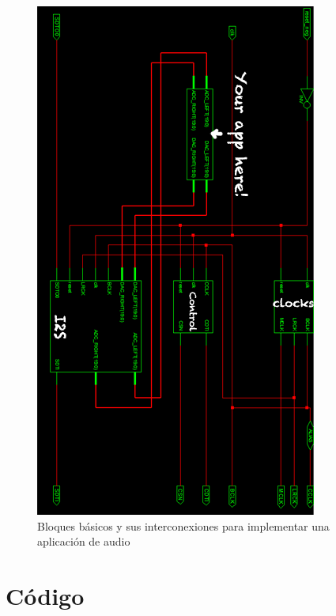 \begin{figure}[H]
\begin{center}
	\includegraphics[scale=0.85]{./fig}
\caption{Bloques básicos y sus interconexiones para implementar una aplicación de audio}
\end{center}
\end{figure}
		

		

\section{Código}
